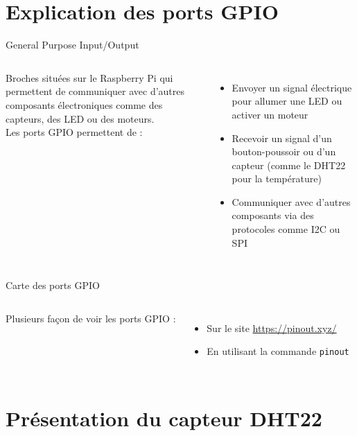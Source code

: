 \documentclass[aspectratio=169,xcolor=dvipsnames]{beamer}
\begin{document}
\section{Explication des ports GPIO}

\begin{frame}{General Purpose Input/Output}
    \begin{columns}[c] %

        Broches situées sur le Raspberry Pi qui permettent de communiquer avec d'autres composants électroniques comme des capteurs, des LED ou des moteurs.\\
        \vspace{5mm}
        Les ports GPIO permettent de :
        \begin{itemize}
            \item Envoyer un signal électrique pour allumer une LED ou activer un moteur
            \item Recevoir un signal d'un bouton-poussoir ou d'un capteur (comme le DHT22 pour la température)
            \item Communiquer avec d'autres composants via des protocoles comme I2C ou SPI
        \end{itemize}
    \end{columns}
\end{frame}

\begin{frame}{Carte des ports GPIO}
    \begin{columns}[c] %

        Plusieurs façon de voir les ports GPIO :
        \vspace{5mm}
        \begin{itemize}
            \item Sur le site \url{https://pinout.xyz/}
            \item En utilisant la commande \texttt{pinout}
        \end{itemize}
    \end{columns}
\end{frame}


\section{Présentation du capteur DHT22}
\end{document}
